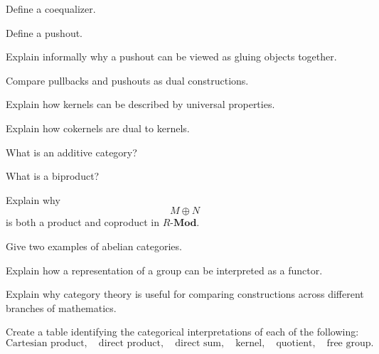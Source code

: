 \begin{exercise}[1]
Define a coequalizer.
\end{exercise}

\begin{exercise}[1]
Define a pushout.
\end{exercise}

\begin{exercise}[2]
Explain informally why a pushout can be viewed as gluing objects together.
\end{exercise}

\begin{exercise}[2]
Compare pullbacks and pushouts as dual constructions.
\end{exercise}

\begin{exercise}[2]
Explain how kernels can be described by universal properties.
\end{exercise}

\begin{exercise}[2]
Explain how cokernels are dual to kernels.
\end{exercise}

\begin{exercise}[1]
What is an additive category?
\end{exercise}

\begin{exercise}[1]
What is a biproduct?
\end{exercise}

\begin{exercise}[2]
Explain why
\[ M\oplus N \]
is both a product and coproduct in \(R\text{-}\mathbf{Mod}\).
\end{exercise}

\begin{exercise}[2]
Give two examples of abelian categories.
\end{exercise}

\begin{exercise}[2]
Explain how a representation of a group can be interpreted as a functor.
\end{exercise}

\begin{exercise}[2]
Explain why category theory is useful for comparing constructions across
different branches of mathematics.
\end{exercise}

\begin{exercise}[3]
Create a table identifying the categorical interpretations of each of the
following:
\[
\text{Cartesian product},\quad
\text{direct product},\quad
\text{direct sum},\quad
\text{kernel},\quad
\text{quotient},\quad
\text{free group}.
\]
\end{exercise}

